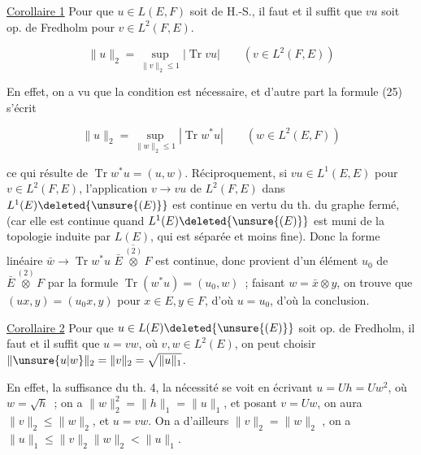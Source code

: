 \uline{Corollaire 1} Pour que $u\in L(E,F)$ soit  de H.-S., il faut et il
suffit que  $vu$ soit op. de Fredholm pour  $v\in L^2(F,E)$.
 

\[
\|u\|_2=\sup_{\|v\|_2\leq1}|\operatorname{Tr}vu|\qquad(v\in L^2(F,E)) \tag*{(26)}
\]

En effet, on a vu que la condition est nécessaire, et
d'autre part la formule (25) s'écrit

\[
\|u\|_2=\sup_{\|w\|_2\leq1}|\operatorname{Tr}w^*u|\qquad(w\in L^2(E,F))
\]

ce qui résulte  de $\operatorname{Tr}w^*u=(u,w)$. Réciproquement,
si $vu\in L^1(E,E)$ pour  $v\in L^2(F,E)$,
l'application $v\to vu$ de $L^2(F,E)$ dans $L^1(E)\deleted{\unsure{(E)}}$
est continue en vertu du th. du graphe fermé,
(car elle est continue quand $L^1(E)\deleted{\unsure{(E)}}$ est muni de
la topologie induite par $L(E)$, qui est séparée et moins fine).
Donc la forme linéaire $\bar w\to\operatorname{Tr}w^*u$   $\overline{\bar E\overset{(2)}{\otimes}F}$ est
continue, donc provient d'un élément $u_0$ de $\bar E\overset{(2)}{\otimes}F$
par la formule  $\operatorname{Tr}(w^*u)=(u_0,w)$ \,; faisant
$w=\bar x\otimes y$, on trouve que $(ux,y)=(u_0x,y)$ pour
 $x\in E,y\in F$, d'où $u=u_0$, d'où la conclusion.


\uline{Corollaire 2} Pour que $u\in L(E)\deleted{\unsure{(E)}}$ soit op. de Fredholm,
il faut et il suffit que $u=vw$, où $v,w\in L^2(E)$, on
peut choisir $\|\unsure{u|w}\|_2=\|v\|_2=\sqrt{\|u\|_1}$.

En effet, la suffisance   du th. 4, la
nécessité se voit en écrivant $u=Uh=Uw^2$, où
$w=\sqrt h$ \,; on a  $\|w\|_2^2=\|h\|_1=\|u\|_1$,
et posant $v=Uw$, on aura $\|v\|_2\leq\|w\|_2$, et
 $u=vw$. On a d'ailleurs $\|v\|_2=\|w\|_2$ , 
on a $\|u\|_1\leq\|v\|_2\|w\|_2<\|u\|_1$.

